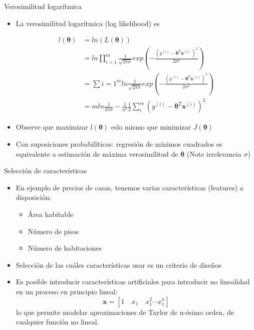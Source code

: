 \documentclass[10pt]{beamer}
\begin{document}
\begin{frame}[fragile]{Verosimilitud logarítmica}

\begin{itemize}
\item La verosimilitud logarítmica (log likelihood) es 

\begin{equation*} \label{eq1}
\begin{split}
l(\boldsymbol{\theta}) & = ln(L(\boldsymbol{\theta}))  \\
& = ln \prod_{i=1}^{m} \frac{1}{\sqrt{2\pi \sigma}} exp \left( -\frac{(y^{(i)}-{\boldsymbol{\theta} ^T}\boldsymbol{x}^{(i)})^2}{2\sigma^2} \right)  \\
& = \sum{i=1}^{m} ln \frac{1}{\sqrt{2\pi \sigma}} exp \left( -\frac{(y^{(i)}-{\boldsymbol{\theta} ^T}\boldsymbol{x}^{(i)})^2}{2\sigma^2} \right)\\
& = m ln \frac{1}{{2\pi \sigma}} - \frac{1}{\sigma^{2}}\frac{1}{2} \sum_{i}^{m} (y^{(i)}-{\boldsymbol{\theta} ^T}\boldsymbol{x}^{(i)})^2 
\end{split}
\end{equation*}



\item Observe que maximizar $l(\boldsymbol{\theta})$ eslo mismo que minimizar $J(\boldsymbol{\theta})$ 
\item Con suposiciones probabilíticas: regresión de mínimos cuadrados es equivalente a estimación de máxima verosimilitud de $\boldsymbol{\theta}$ (Note irrelevancia $\sigma$)
\end{itemize}

\end{frame}
\begin{frame}[fragile]{Selección de características}

\begin{itemize}
\item En ejemplo de precios de casas, tenemos varias características (features) a disposición: 
\begin{itemize}
\item Área habitable 
\item Número de pisos 
\item Número de habitaciones 
\end{itemize}

\item Selección de las cuáles características usar es un criterio de diseños 
\item Es posible introducir características artificiales para introducir no linealidad en un proceso en principio lineal:
\begin{equation*}
\boldsymbol{x}= [1 \quad x_{1} \quad x_{1}^{2} \cdots x_{1}^{n}]
\end{equation*}
lo que permite modelar aproximaciones de Taylor de n-ésimo orden, de cualquier función no lineal.

\end{itemize}

\end{frame}
\end{document}
